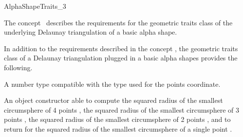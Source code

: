 \begin{ccRefConcept} {AlphaShapeTraits_3}


\ccDefinition
The concept \ccRefName\ describes the requirements 
for the geometric traits class
of  the underlying  Delaunay triangulation of a basic alpha shape.



\ccRefines
{}

In addition to the requirements described in the concept 
,
the geometric traits class of a
Delaunay triangulation plugged in a basic alpha shapes
provides the following.


\ccTypes

 {A number type compatible with the type used for
  the points coordinate.}

{An object constructor able to compute the squared radius of the
 smallest circumsphere  of  4 points ,
the squared radius of the
smallest circumsphere of  3 points ,
the squared radius of  the smallest  circumsphere of 2 points ,
and to return  for the squared radius of  the smallest  circumsphere
of a single point .} 


\ccCreation
{}
\ccThreeToTwo



\ccAccessFunctions
{} {}

\ccHasModels

\end{ccRefConcept}
